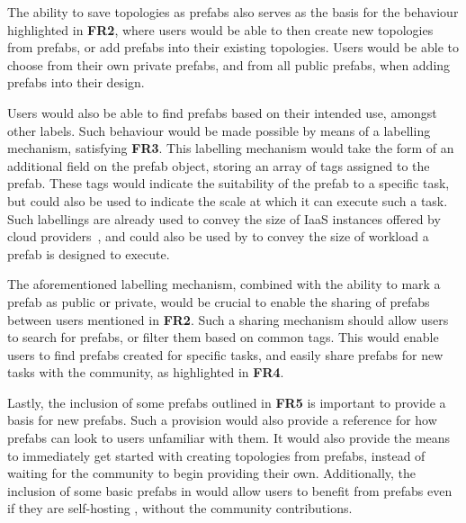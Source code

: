 \documentclass[11pt]{article}
\begin{document}
		The ability to save topologies as prefabs also serves as the basis for the behaviour highlighted in \textbf{FR2}, where users would be able to then create new topologies from prefabs, or add prefabs into their existing topologies.
		Users would be able to choose from their own private prefabs, and from all public prefabs, when adding prefabs into their design.

		Users would also be able to find prefabs based on their intended use, amongst other labels. 
		Such behaviour would be made possible by means of a labelling mechanism, satisfying \textbf{FR3}.
		This labelling mechanism would take the form of an additional field on the prefab object, storing an array of tags assigned to the prefab.
		These tags would indicate the suitability of the prefab to a specific task, but could also be used to indicate the scale at which it can execute such a task.
		Such labellings are already used to convey the size of IaaS instances offered by cloud providers~\cite{davatz2017}, and could also be used by \opendc{} to convey the size of workload a prefab is designed to execute.

		The aforementioned labelling mechanism, combined with the ability to mark a prefab as public or private, would be crucial to enable the sharing of prefabs between users mentioned in \textbf{FR2}.
		Such a sharing mechanism should allow users to search for prefabs, or filter them based on common tags.
		This would enable users to find prefabs created for specific tasks, and easily share prefabs for new tasks with the community, as highlighted in \textbf{FR4}.

		Lastly, the inclusion of some \opendc{} prefabs outlined in \textbf{FR5} is important to provide a basis for new prefabs.
		Such a provision would also provide a reference for how prefabs can look to users unfamiliar with them.
		It would also provide the means to immediately get started with creating topologies from prefabs, instead of waiting for the community to begin providing their own.
		Additionally, the inclusion of some basic prefabs in \opendc{} would allow users to benefit from prefabs even if they are self-hosting \opendc{}, without the community contributions.

\newpage
\end{document}

